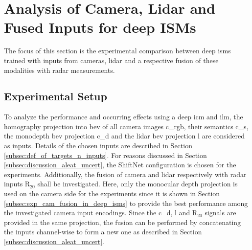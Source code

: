 \section{Analysis of Camera, Lidar and Fused Inputs for deep ISMs}
\label{sec:cam_lidar_fusion_in_deep_isms}
The focus of this section is the experimental comparison between deep \gls{ism}s trained with inputs from cameras, lidar and a respective fusion of these modalities with radar measurements.
%
\subsection{Experimental Setup}
\label{subsec:setup_cam_lidar_fusion_in_deep_isms}
To analyze the performance and occurring effects using a deep \gls{icm} and \gls{ilm}, the homography projection into \gls{bev} of all camera images \gls{c_rgb}, their semantics \gls{c_s}, the \gls{monodepth} \gls{bev} projection \gls{c_d} and the lidar \gls{bev} projection \gls{l} are considered as inputs. Details of the chosen inputs are described in Section \ref{subsec:def_of_targets_n_inputs}. For reasons discussed in Section \ref{subsec:discussion_aleat_uncert}, the ShiftNet configuration is chosen for the experiments. Additionally, the fusion of camera and lidar respectively with radar inputs R$_{20}$ shall be investigated. Here, only the monocular depth projection is used on the camera side for the experiments since it is shown in Section \ref{subsec:exp_cam_fusion_in_deep_isms} to provide the best performance among the investigated camera input encodings. Since the \gls{c_d}, \gls{l} and R$_{20}$ signals are provided in the same projection, the fusion can be performed by concatenating the inputs channel-wise to form a new one as described in Section \ref{subsec:discussion_aleat_uncert}.
%
